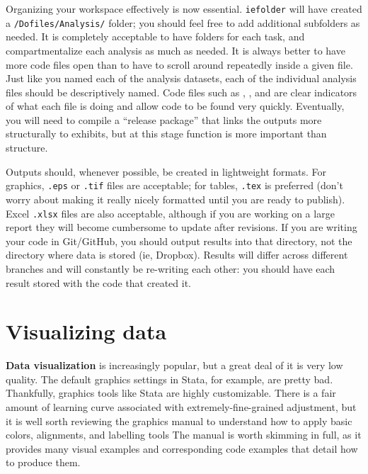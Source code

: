 Organizing your workspace effectively is now essential.
\texttt{iefolder} will have created a \texttt{/Dofiles/Analysis/} folder;
you should feel free to add additional subfolders as needed.
It is completely acceptable to have folders for each task,
and compartmentalize each analysis as much as needed.
It is always better to have more code files open
than to have to scroll around repeatedly inside a given file.
Just like you named each of the analysis datasets,
each of the individual analysis files should be descriptively named.
Code files such as ,
, and 
are clear indicators of what each file is doing
and allow code to be found very quickly.
Eventually, you will need to compile a ``release package''
that links the outputs more structurally to exhibits,
but at this stage function is more important than structure.

Outputs should, whenever possible, be created in lightweight formats.
For graphics, \texttt{.eps} or \texttt{.tif} files are acceptable;
for tables, \texttt{.tex} is preferred (don't worry about making it
really nicely formatted until you are ready to publish).
Excel \texttt{.xlsx} files are also acceptable,
although if you are working on a large report
they will become cumbersome to update after revisions.
If you are writing your code in Git/GitHub,
you should output results into that directory,
not the directory where data is stored (ie, Dropbox).
Results will differ across different branches
and will constantly be re-writing each other:
you should have each result stored with the code that created it.


\section{Visualizing data}

\textbf{Data visualization} is increasingly popular,
but a great deal of it is very low quality.\cite{healy2018data,wilke2019fundamentals}
The default graphics settings in Stata, for example,
are pretty bad.
Thankfully, graphics tools like Stata are highly customizable.
There is a fair amount of learning curve associated with
extremely-fine-grained adjustment,
but it is well sorth reviewing the graphics manual
to understand how to apply basic colors, alignments, and labelling tools
The manual is worth skimming in full, as it provides
many visual examples and corresponding code examples
that detail how to produce them.

